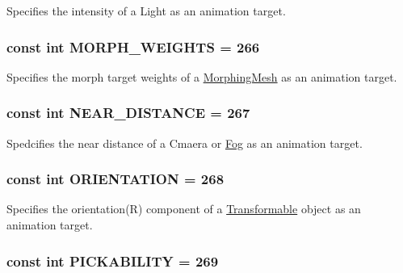 Specifies the intensity of a Light as an animation target. \hypertarget{classm3g_1_1AnimationTrack_d75f3e3033e268d0a74f9533cfa9b9d6}{
\subsubsection[{MORPH\_\-WEIGHTS}]{\setlength{\rightskip}{0pt plus 5cm}const int {\bf MORPH\_\-WEIGHTS} = 266}}
\label{classm3g_1_1AnimationTrack_d75f3e3033e268d0a74f9533cfa9b9d6}


Specifies the morph target weights of a \hyperlink{classm3g_1_1MorphingMesh}{MorphingMesh} as an animation target. \hypertarget{classm3g_1_1AnimationTrack_74f49e3b52778aff378dac012e59cdb2}{
\subsubsection[{NEAR\_\-DISTANCE}]{\setlength{\rightskip}{0pt plus 5cm}const int {\bf NEAR\_\-DISTANCE} = 267}}
\label{classm3g_1_1AnimationTrack_74f49e3b52778aff378dac012e59cdb2}


Spedcifies the near distance of a Cmaera or \hyperlink{classm3g_1_1Fog}{Fog} as an animation target. \hypertarget{classm3g_1_1AnimationTrack_c7fe423a6a639520b0b3d1c1e663784b}{
\subsubsection[{ORIENTATION}]{\setlength{\rightskip}{0pt plus 5cm}const int {\bf ORIENTATION} = 268}}
\label{classm3g_1_1AnimationTrack_c7fe423a6a639520b0b3d1c1e663784b}


Specifies the orientation(R) component of a \hyperlink{classm3g_1_1Transformable}{Transformable} object as an animation target. \hypertarget{classm3g_1_1AnimationTrack_87fcd8136941a05a8a95c61e499692e0}{
\subsubsection[{PICKABILITY}]{\setlength{\rightskip}{0pt plus 5cm}const int {\bf PICKABILITY} = 269}}
\label{classm3g_1_1AnimationTrack_87fcd8136941a05a8a95c61e499692e0}


